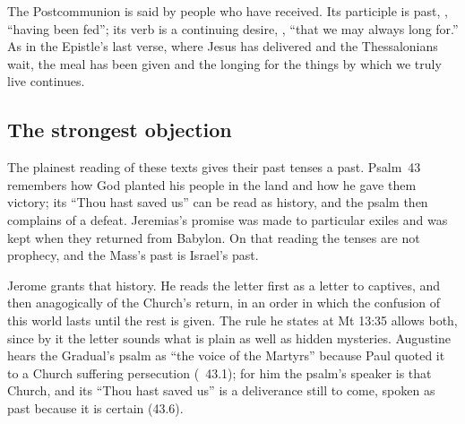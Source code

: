 The Postcommunion is said by people who have received. Its participle is
past, , ``having been fed''; its verb is a continuing desire,
, ``that we may always long for.'' As in the
Epistle's last verse, where Jesus has delivered and the Thessalonians wait,
the meal has been given and the longing for the things by which we truly live
continues.

\subsection{The strongest objection}
\label{sec:awaited-objection}

The plainest reading of these texts gives their past tenses a past. Psalm~43
remembers how God planted his people in the land and how he gave them
victory; its ``Thou hast saved us'' can be read as history, and the psalm
then complains of a defeat. Jeremias's promise was made to particular exiles
and was kept when they returned from Babylon. On that reading the tenses are
not prophecy, and the Mass's past is Israel's past.

Jerome grants that history. He reads the letter first as a letter to
captives, and then anagogically of the Church's return, in an order in which
the confusion of this world lasts until the rest is given. The rule he states
at Mt 13:35 allows both, since by it the letter sounds what is plain as well
as hidden mysteries. Augustine hears the Gradual's psalm as ``the voice of the
Martyrs'' because Paul quoted it to a Church suffering persecution
(~43.1); for him the psalm's speaker is that Church, and its ``Thou hast saved us'' is a deliverance still
to come, spoken as past because it is certain (43.6).

